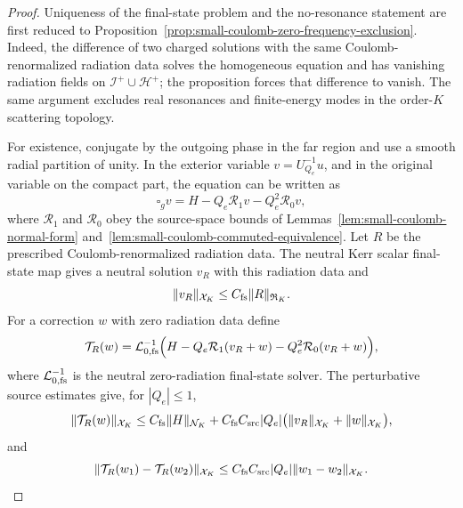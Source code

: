 \documentclass[11pt]{article}
\numberwithin{equation}{section}
\theoremstyle{plain}
\theoremstyle{definition}
\theoremstyle{remark}
\begin{document}
\begin{proof}
Uniqueness of the final-state problem and the no-resonance statement are first reduced to Proposition~\ref{prop:small-coulomb-zero-frequency-exclusion}.  Indeed, the difference of two charged solutions with the same Coulomb-renormalized radiation data solves the homogeneous equation and has vanishing radiation fields on \(\mathcal I^+\cup\mathcal H^+\); the proposition forces that difference to vanish.  The same argument excludes real resonances and finite-energy modes in the order-\(K\) scattering topology.

For existence, conjugate by the outgoing phase in the far region and use a smooth radial partition of unity.  In the exterior variable \(v=U_{Q_e}^{-1}u\), and in the original variable on the compact part, the equation can be written as
\begin{equation}\label{eq:small-coulomb-final-state-normal-form}
 \square_g v=H-Q_e\mathcal R_1v-Q_e^2\mathcal R_0v,
\end{equation}
where \(\mathcal R_1\) and \(\mathcal R_0\) obey the source-space bounds of Lemmas~\ref{lem:small-coulomb-normal-form} and~\ref{lem:small-coulomb-commuted-equivalence}.  Let \(R\) be the prescribed Coulomb-renormalized radiation data.  The neutral Kerr scalar final-state map gives a neutral solution \(v_R\) with this radiation data and
\begin{equation}\label{eq:small-coulomb-neutral-final-state-bound}
 \|v_R\|_{\mathcal X_K}\le C_{\rm fs}\|R\|_{\mathfrak R_K}.
\end{equation}
For a correction \(w\) with zero radiation data define
\begin{equation}
 \mathcal T_R(w)=\mathcal L^{-1}_{0,{\rm fs}}\Bigl(H-Q_e\mathcal R_1(v_R+w)-Q_e^2\mathcal R_0(v_R+w)\Bigr),
\end{equation}
where \(\mathcal L^{-1}_{0,{\rm fs}}\) is the neutral zero-radiation final-state solver.  The perturbative source estimates give, for \(|Q_e|\le1\),
\begin{equation}\label{eq:small-coulomb-final-state-map-bound}
 \|\mathcal T_R(w)\|_{\mathcal X_K}
 \le C_{\rm fs}\|H\|_{\mathcal N_K}
 +C_{\rm fs}C_{\rm src}|Q_e|\bigl(\|v_R\|_{\mathcal X_K}+\|w\|_{\mathcal X_K}\bigr),
\end{equation}
and
\begin{equation}\label{eq:small-coulomb-final-state-lipschitz}
 \|\mathcal T_R(w_1)-\mathcal T_R(w_2)\|_{\mathcal X_K}
 \le C_{\rm fs}C_{\rm src}|Q_e|\|w_1-w_2\|_{\mathcal X_K}.
\end{equation}

\end{proof}
\end{document}
